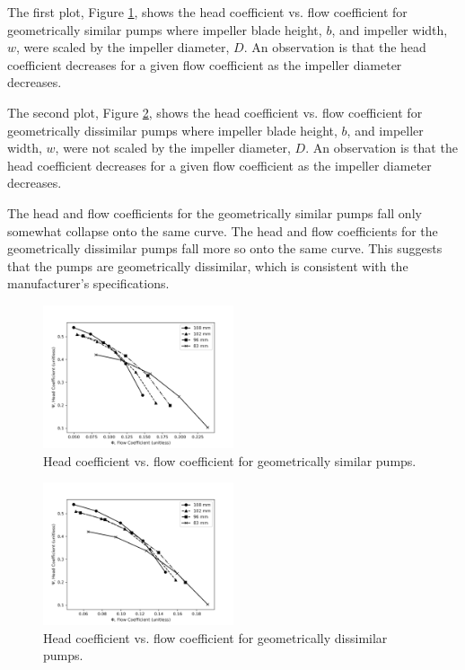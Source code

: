 The first plot, Figure \ref{fig:geometric_similarity_head_coefficient}, shows the head coefficient vs. flow coefficient for geometrically similar pumps where impeller blade height, $b$, and impeller width, $w$, were scaled by the impeller diameter, $D$. An observation is that the head coefficient decreases for a given flow coefficient as the impeller diameter decreases.  

The second plot, Figure \ref{fig:geometric_dissimilarity_head_coefficient}, shows the head coefficient vs. flow coefficient for geometrically dissimilar pumps where impeller blade height, $b$, and impeller width, $w$, were not scaled by the impeller diameter, $D$. An observation is that the head coefficient decreases for a given flow coefficient as the impeller diameter decreases. 

The head and flow coefficients for the geometrically similar pumps fall only somewhat collapse onto the same curve. The head and flow coefficients for the geometrically dissimilar pumps fall more so onto the same curve. This suggests that the pumps are geometrically dissimilar, which is consistent with the manufacturer's specifications.
\begin{figure}[h]
    \centering
    \includegraphics[width=0.5\textwidth]{Sections/Figures/Geometrically Similar Pump Coefficients Plot.png}
    \caption{Head coefficient vs. flow coefficient for geometrically similar pumps.}
    \label{fig:geometric_similarity_head_coefficient}
\end{figure}
\begin{figure}[h]
    \centering
    \includegraphics[width=0.5\textwidth]{Sections/Figures/Geometrically Dissimilar Pump Coefficients Plot.png}
    \caption{Head coefficient vs. flow coefficient for geometrically dissimilar pumps.}
    \label{fig:geometric_dissimilarity_head_coefficient}
\end{figure}

